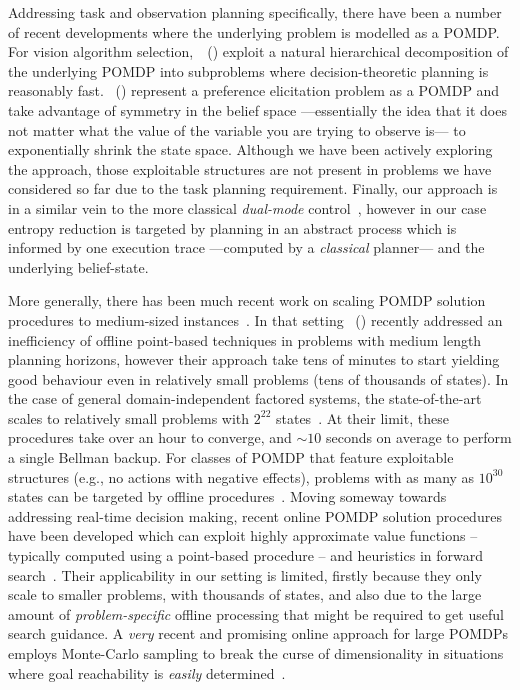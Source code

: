 






Addressing task and observation planning specifically, there have been
a number of recent developments where the underlying problem is
modelled as a POMDP.
For vision algorithm
selection,~\citeauthor{hippo-jnl}~(\citeyear{hippo-jnl}) exploit a
natural hierarchical decomposition of the underlying POMDP into
subproblems where decision-theoretic planning is reasonably
fast. \citeauthor{doshi08:pref_elic}~(\citeyear{doshi08:pref_elic})
represent a preference elicitation problem as a POMDP and take
advantage of symmetry in the belief space ---essentially the idea that
it does not matter what the value of the variable you are trying to
observe is--- to exponentially shrink the state space. Although we
have been actively exploring the \citeauthor{doshi08:pref_elic}
approach, those exploitable structures are not present in problems we
have considered so far due to the task planning requirement. 
Finally,
our approach is in a similar vein to the more classical {\em
dual-mode} control~\cite{cassandra96actingunder}, however in our case
entropy reduction is targeted by planning in an abstract process which
is informed by one execution trace ---computed by a {\em classical}
planner--- and the underlying belief-state.


More generally, there has been much recent work on scaling POMDP
solution procedures to medium-sized instances~\cite{shani:etal:08}. In
that
setting \citeauthor{kurniawati:etal:2010}~(\citeyear{kurniawati:etal:2010})
recently addressed an inefficiency of offline point-based techniques
in problems with medium length planning horizons, however their
approach take tens of minutes to start yielding good behaviour even in
relatively small problems (tens of thousands of states). In the case
of general domain-independent factored systems, the state-of-the-art
scales to relatively small problems with $2^{22}$
states~\cite{shani:etal:2008}. At their limit, these procedures take
over an hour to converge, and $\sim10$ seconds on average to perform a
single Bellman backup.  For classes of POMDP that feature exploitable
structures (e.g., no actions with negative effects), problems with as
many as $10^{30}$ states can be targeted by offline
procedures~\cite{brunskill:russell:2010}. Moving someway towards
addressing real-time decision making, recent online POMDP solution
procedures have been developed which can exploit highly approximate
value functions -- typically computed using a point-based procedure --
and heuristics in forward search~\cite{ross:etal:2008}. Their
applicability in our setting is limited, firstly because they only
scale to smaller problems, with thousands of states, and also due to
the large amount of
\emph{problem-specific} offline processing that might be required to get useful
search guidance. A {\em very} recent and promising online approach for
large POMDPs employs Monte-Carlo sampling to break the curse of
dimensionality in situations where goal reachability is {\em easily}
determined~\cite{silver:veness:2010}.


